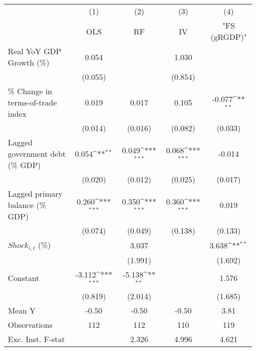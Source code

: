 {
\def\sym#1{\ifmmode^{#1}\else\(^{#1}\)\fi}
\begin{tabular}{l*{4}{c}}
\toprule
                    &\multicolumn{1}{c}{(1)}&\multicolumn{1}{c}{(2)}&\multicolumn{1}{c}{(3)}&\multicolumn{1}{c}{(4)}\\
                    &\multicolumn{1}{c}{OLS}&\multicolumn{1}{c}{RF}&\multicolumn{1}{c}{IV}&\multicolumn{1}{c}{ "FS (gRGDP)" }\\
\midrule
Real YoY GDP Growth (\%)&       0.054         &                     &       1.030         &                     \\
                    &     (0.055)         &                     &     (0.854)         &                     \\
\addlinespace
\% Change in terms-of-trade index&       0.019         &       0.017         &       0.105         &      -0.077\sym{**} \\
                    &     (0.014)         &     (0.016)         &     (0.082)         &     (0.033)         \\
\addlinespace
Lagged government debt (\% GDP)&       0.054\sym{**} &       0.049\sym{***}&       0.068\sym{***}&      -0.014         \\
                    &     (0.020)         &     (0.012)         &     (0.025)         &     (0.017)         \\
\addlinespace
Lagged primary balance (\% GDP)&       0.260\sym{***}&       0.350\sym{***}&       0.360\sym{***}&       0.019         \\
                    &     (0.074)         &     (0.049)         &     (0.138)         &     (0.133)         \\
\addlinespace
$ Shock_{i,t}$ (\%) &                     &       3.037         &                     &       3.638\sym{**} \\
                    &                     &     (1.991)         &                     &     (1.692)         \\
\addlinespace
Constant            &      -3.112\sym{***}&      -5.138\sym{**} &                     &       1.576         \\
                    &     (0.819)         &     (2.014)         &                     &     (1.685)         \\
\midrule
Mean Y              &       -0.50         &       -0.50         &       -0.50         &        3.81         \\
Observations        &         112         &         112         &         110         &         119         \\
Exc. Inst. F-stat   &                     &       2.326         &       4.996         &       4.621         \\
\bottomrule
\end{tabular}
}

